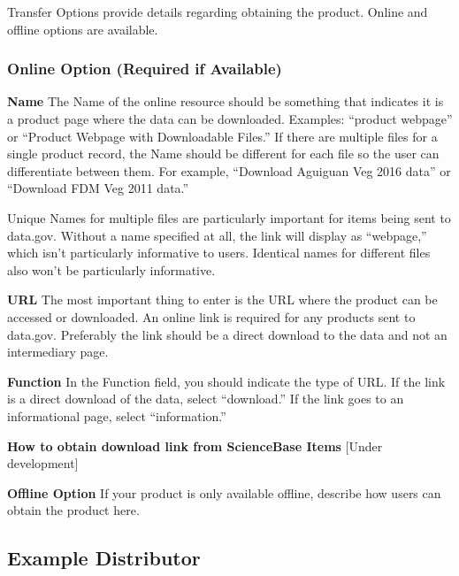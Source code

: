 \documentclass[
]{book}
\begin{document}
Transfer Options provide details regarding obtaining the product. Online and offline options are available.

\hypertarget{online-option-required-if-available}{%
\subsubsection{Online Option (Required if Available)}\label{online-option-required-if-available}}

\textbf{Name}
The Name of the online resource should be something that indicates it is a product page where the data can be downloaded. Examples: ``product webpage'' or ``Product Webpage with Downloadable Files.'' If there are multiple files for a single product record, the Name should be different for each file so the user can differentiate between them. For example, ``Download Aguiguan Veg 2016 data'' or ``Download FDM Veg 2011 data.''

Unique Names for multiple files are particularly important for items being sent to data.gov. Without a name specified at all, the link will display as ``webpage,'' which isn't particularly informative to users. Identical names for different files also won't be particularly informative.

\textbf{URL}
The most important thing to enter is the URL where the product can be accessed or downloaded.
An online link is required for any products sent to data.gov. Preferably the link should be a direct download to the data and not an intermediary page.

\textbf{Function}
In the Function field, you should indicate the type of URL. If the link is a direct download of the data, select ``download.'' If the link goes to an informational page, select ``information.''

\textbf{How to obtain download link from ScienceBase Items}
{[}Under development{]}

\textbf{Offline Option}
If your product is only available offline, describe how users can obtain the product here.

\hypertarget{example-distributor}{%
\subsection*{Example Distributor}\label{example-distributor}}
\end{document}
